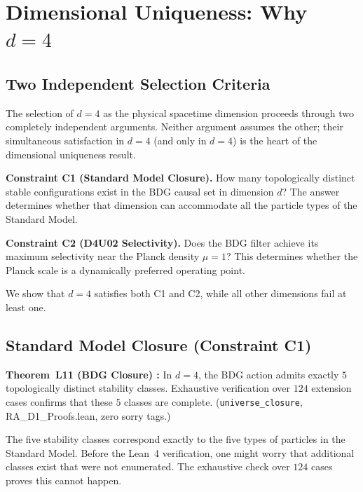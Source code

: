 \documentclass[12pt,a4paper]{article}
\begin{document}
\section{Dimensional Uniqueness: Why $d=4$}\label{sec:uniqueness}

\subsection{Two Independent Selection Criteria}

The selection of $d=4$ as the physical spacetime dimension proceeds through two completely independent arguments.  Neither argument assumes the other; their simultaneous satisfaction in $d=4$ (and only in $d=4$) is the heart of the dimensional uniqueness result.

\textbf{Constraint C1 (Standard Model Closure).}  How many topologically distinct stable configurations exist in the BDG causal set in dimension $d$?  The answer determines whether that dimension can accommodate all the particle types of the Standard Model.

\textbf{Constraint C2 (D4U02 Selectivity).}  Does the BDG filter achieve its maximum selectivity near the Planck density $\mu=1$?  This determines whether the Planck scale is a dynamically preferred operating point.

We show that $d=4$ satisfies both C1 and C2, while all other dimensions fail at least one.

\subsection{Standard Model Closure (Constraint C1)}\label{sec:SM_closure}

\begin{leanbox}
\textbf{Theorem~L11 (BDG Closure) \statusLV:} In $d=4$, the BDG action admits exactly $5$ topologically distinct stability classes.  Exhaustive verification over $124$ extension cases confirms that these $5$ classes are complete.  (\texttt{universe\_closure}, RA\_D1\_Proofs.lean, zero sorry tags.)
\end{leanbox}

The five stability classes correspond exactly to the five types of particles in the Standard Model.  Before the Lean~4 verification, one might worry that additional classes exist that were not enumerated.  The exhaustive check over $124$ cases proves this cannot happen.
\end{document}
